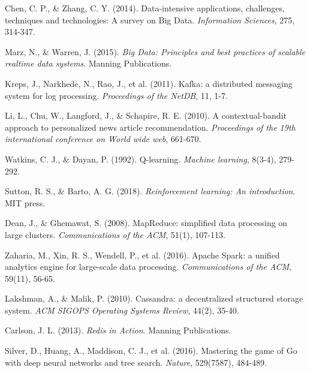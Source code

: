 \begin{thebibliography}{99}

Chen, C. P., \& Zhang, C. Y. (2014). Data-intensive applications, challenges, techniques and technologies: A survey on Big Data. \textit{Information Sciences}, 275, 314-347.

Marz, N., \& Warren, J. (2015). \textit{Big Data: Principles and best practices of scalable realtime data systems}. Manning Publications.

Kreps, J., Narkhede, N., Rao, J., et al. (2011). Kafka: a distributed messaging system for log processing. \textit{Proceedings of the NetDB}, 11, 1-7.

Li, L., Chu, W., Langford, J., \& Schapire, R. E. (2010). A contextual-bandit approach to personalized news article recommendation. \textit{Proceedings of the 19th international conference on World wide web}, 661-670.

Watkins, C. J., \& Dayan, P. (1992). Q-learning. \textit{Machine learning}, 8(3-4), 279-292.

Sutton, R. S., \& Barto, A. G. (2018). \textit{Reinforcement learning: An introduction}. MIT press.

Dean, J., \& Ghemawat, S. (2008). MapReduce: simplified data processing on large clusters. \textit{Communications of the ACM}, 51(1), 107-113.

Zaharia, M., Xin, R. S., Wendell, P., et al. (2016). Apache Spark: a unified analytics engine for large-scale data processing. \textit{Communications of the ACM}, 59(11), 56-65.

Lakshman, A., \& Malik, P. (2010). Cassandra: a decentralized structured storage system. \textit{ACM SIGOPS Operating Systems Review}, 44(2), 35-40.

Carlson, J. L. (2013). \textit{Redis in Action}. Manning Publications.

Silver, D., Huang, A., Maddison, C. J., et al. (2016). Mastering the game of Go with deep neural networks and tree search. \textit{Nature}, 529(7587), 484-489.


\end{thebibliography}
